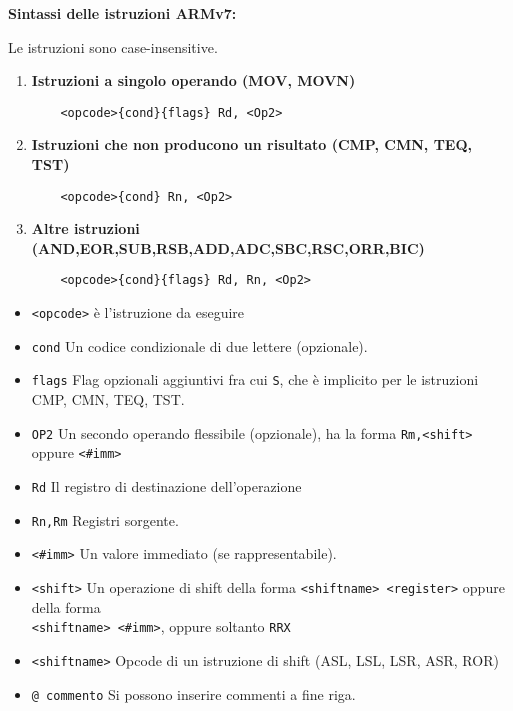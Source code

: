 \begin{defn}
\textbf{Sintassi delle istruzioni ARMv7:}

\begin{note}
	Le istruzioni sono case-insensitive.
\end{note}

\begin{enumerate}
	\item \textbf{Istruzioni a singolo operando (MOV, MOVN)}
	\begin{Verbatim}
	<opcode>{cond}{flags} Rd, <Op2>
	\end{Verbatim}

	\item \textbf{Istruzioni che non producono un risultato (CMP, CMN, TEQ, TST)}
	\begin{Verbatim}
	<opcode>{cond} Rn, <Op2>
	\end{Verbatim}

	\item \textbf{Altre istruzioni (AND,EOR,SUB,RSB,ADD,ADC,SBC,RSC,ORR,BIC)}
	\begin{Verbatim}
	<opcode>{cond}{flags} Rd, Rn, <Op2>
	\end{Verbatim}
\end{enumerate}


\begin{itemize}
	\item \texttt{<opcode>} è l'istruzione da eseguire
	\item \texttt{{cond}} Un codice condizionale di due lettere (opzionale).
	\item \texttt{{flags}} Flag opzionali aggiuntivi fra cui \texttt{S}, che è implicito per le istruzioni CMP, CMN, TEQ, TST.
	\item \texttt{OP2} Un secondo operando flessibile (opzionale), ha la forma \texttt{Rm{,<shift>}} oppure \texttt{<\#imm>}
	\item \texttt{Rd} Il registro di destinazione dell'operazione
	\item \texttt{Rn,Rm} Registri sorgente.
	\item \texttt{<\#imm>} Un valore immediato (se rappresentabile).
	\item \texttt{<shift>} Un operazione di shift della forma \texttt{<shiftname> <register>} oppure della forma \\
	 \texttt{<shiftname> <\#imm>}, oppure soltanto \texttt{RRX}
	\item \texttt{<shiftname>} Opcode di un istruzione di shift (ASL, LSL, LSR, ASR, ROR)
	\item \texttt{@ commento} Si possono inserire commenti a fine riga.
\end{itemize}
\end{defn}

